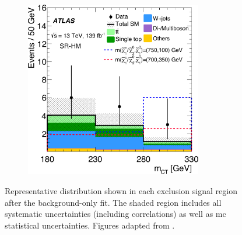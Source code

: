 \begin{figure}
\begin{subfigure}[b]{0.5\linewidth}
	\end{subfigure}\hfill
	\par\bigskip
	\par\bigskip
	\begin{subfigure}[b]{0.5\linewidth}
		\centering\includegraphics[width=0.85\textwidth]{fig_05c_yellow}
	\end{subfigure}\hfill

	\caption{Representative distribution shown in each exclusion signal region after the background-only fit. The shaded region includes all systematic uncertainties (including correlations) as well as \gls{mc} statistical uncertainties. Figures adapted from \cite{SUSY-2019-08}.}
	\label{fig:SR_distributions_postfit}
\end{figure}


